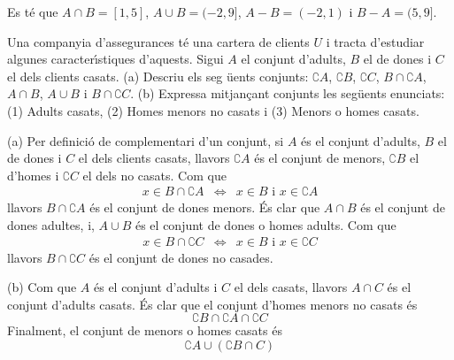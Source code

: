 \begin{solucio}
Es t\'{e} que $A\cap B=[1,5]$, $A\cup B=(-2,9]$, $A-B=(-2,1)$ i $B-A=(5,9]$.
\end{solucio}

\begin{exer}
Una companyia d'assegurances t\'{e} una cartera de clients $U$ i tracta
d'estudiar algunes caracter\'{\i}stiques d'aquests. Sigui $A$ el conjunt
d'adults, $B$ el de dones i $C$ el dels clients casats. (a) Descriu els seg%
\"{u}ents conjunts: $\complement A$, $\complement B$, $\complement C$, $%
B\cap \complement A$, $A\cap B$, $A\cup B$ i $B\cap \complement C$. (b)
Expressa mitjan\c{c}ant conjunts les seg\"{u}ents enunciats: (1) Adults
casats, (2) Homes menors no casats i (3) Menors o homes casats.
\end{exer}

\begin{solucio}
(a) Per definici\'{o} de complementari d'un conjunt, si $A$ \'{e}s el
conjunt d'adults, $B$ el de dones i $C$ el dels clients casats, llavors $%
\complement A$ \'{e}s el conjunt de menors, $\complement B$ el d'homes i $%
\complement C$ el dels no casats. Com que%
\begin{equation*}
\begin{array}{ccc}
x\in B\cap \complement A & \Longleftrightarrow & x\in B\text{ i }x\in
\complement A%
\end{array}%
\end{equation*}%
llavors $B\cap \complement A$ \'{e}s el conjunt de dones menors. \'{E}s clar
que $A\cap B$ \'{e}s el conjunt de dones adultes, i, $A\cup B$ \'{e}s el
conjunt de dones o homes adults. Com que%
\begin{equation*}
\begin{array}{ccc}
x\in B\cap \complement C & \Longleftrightarrow & x\in B\text{ i }x\in
\complement C%
\end{array}%
\end{equation*}%
llavors $B\cap \complement C$ \'{e}s el conjunt de dones no casades.

(b) Com que $A$ \'{e}s el conjunt d'adults i $C$ el dels casats, llavors $%
A\cap C$ \'{e}s el conjunt d'adults casats. \'{E}s clar que el conjunt
d'homes menors no casats \'{e}s%
\begin{equation*}
\complement B\cap \complement A\cap \complement C
\end{equation*}%
Finalment, el conjunt de menors o homes casats \'{e}s%
\begin{equation*}
\complement A\cup (\complement B\cap C)
\end{equation*}
\end{solucio}

